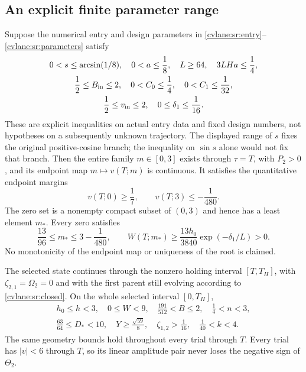 \subsection{An explicit finite parameter range}

\begin{cvlanetheorem}\label{cvlane:sr:theorem}
Suppose the numerical entry and design parameters in
\eqref{cvlane:sr:entry}--\eqref{cvlane:sr:parameters} satisfy
\begin{equation}\label{cvlane:sr:box}
 \begin{gathered}
 0<s\leq\arcsin(1/8),\quad 0<a\leq\frac18,\quad
 L\geq64,\quad 3LHa\leq\frac14,\\
 \frac12\leq B_{\rm in}\leq2,\quad
 0<C_0\leq\frac14,\quad 0<C_1\leq\frac1{32},\\
 \frac12\leq v_{\rm in}\leq2,\quad 0\leq\delta_1\leq\frac1{16}.
 \end{gathered}
\end{equation}
These are explicit inequalities on actual entry data and fixed design
numbers, not hypotheses on a subsequently unknown trajectory.
The displayed range of $s$ fixes the original positive-cosine branch;
the inequality on $\sin s$ alone would not fix that branch.
Then the entire family $m\in[0,3]$ exists through $\tau=T$,
with $P_2>0$, and its endpoint map $m\mapsto v(T;m)$ is continuous.
It satisfies the quantitative endpoint margins
\begin{equation}\label{cvlane:sr:margins}
 v(T;0)\geq\frac17,\qquad v(T;3)\leq-\frac1{480}.
\end{equation}
The zero set is a nonempty compact subset of $(0,3)$ and hence
has a least element $m_*$. Every zero satisfies
\begin{equation}\label{cvlane:sr:rootbounds}
 \frac{13}{96}\leq m_*\leq3-\frac1{480},\qquad
 W(T;m_*)\geq \frac{13h_0}{3840}
                     \exp(-\delta_1/L)>0.
\end{equation}
No monotonicity of the endpoint map or uniqueness of the root is claimed.

The selected state continues through the nonzero holding interval
$[T,T_H]$, with $\zeta_{2,1}=\Omega_2=0$ and with the first parent
still evolving according to \eqref{cvlane:sr:closed}. On the whole selected
interval $[0,T_H]$,
\begin{equation}\label{cvlane:sr:geom-bounds}
 \begin{gathered}
 h_0\leq h<3,\quad 0\leq W<9,\quad
 \frac{191}{512}<B\leq2,\quad
 \frac14<n<3,\\
 \frac{63}{64}\leq D_*<10,\quad
 Y\geq\frac{\sqrt{59}}8,\quad
 \zeta_{1,2}>\frac1{16},\quad
 \frac1{40}<k<4.
 \end{gathered}
\end{equation}
The same geometry bounds hold throughout every trial through $T$.
Every trial has $|v|<6$ through $T$, so its linear amplitude pair
never loses the negative sign of $\Theta_2$.


\end{cvlanetheorem}
